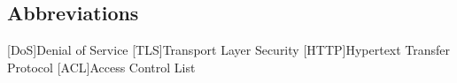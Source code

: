 \newcommand{\abbr}{Abbreviations}
\subsection{Abbreviations}

\begin{acronym}[1234567890]		%
\setlength{\itemsep}{-\parsep}	%

[DoS]{Denial of Service}
[TLS]{Transport Layer Security}
[HTTP]{Hypertext Transfer Protocol}
[ACL]{Access Control List}

\end{acronym}